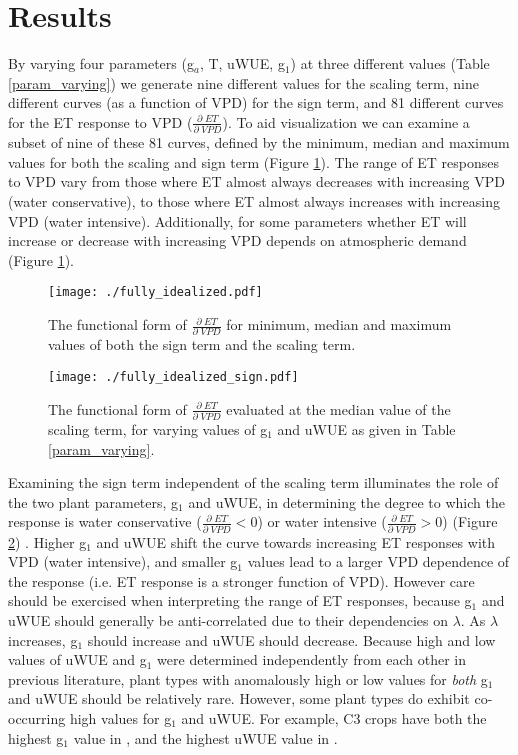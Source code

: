 \documentclass[draft]{agujournal2019}
\begin{document}
\section{Results}
\label{results}

By varying four parameters (g$_a$, T, uWUE, g$_1$) at three different
values (Table \ref{param_varying}) we generate nine different values
for the scaling term, nine different curves (as a function of VPD) for
the sign term, and 81 different curves for the ET response to VPD
($\frac{\partial \; ET}{\partial \; VPD}$). To aid visualization we
can examine a subset of nine of these 81 curves, defined by the
minimum, median and maximum values for both the scaling and sign term
(Figure \ref{full}). The range of ET responses to VPD vary from those
where ET almost always decreases with increasing VPD (water
conservative), to those where ET almost always increases with
increasing VPD (water intensive). Additionally, for some parameters
whether ET will increase or decrease with increasing VPD depends on
atmospheric demand (Figure \ref{full}).

\begin{figure}
  \centering \texttt{[image: ./fully\_idealized.pdf]}
  \caption{The functional form of $\frac{\partial \; ET}{\partial
      \; VPD}$ for minimum, median and maximum values of both the sign
    term and the scaling term.}
  \label{full}
\end{figure}

\begin{figure}
  \centering \texttt{[image: ./fully\_idealized\_sign.pdf]}
  \caption{The functional form of $\frac{\partial \; ET}{\partial
      \; VPD}$ evaluated at the median value of the scaling term, for
    varying values of g$_1$ and uWUE as given in Table \ref{param_varying}.}
  \label{sign}
\end{figure}

Examining the sign term independent of the scaling term illuminates
the role of the two plant parameters, g$_1$ and uWUE, in determining
the degree to which the response is water conservative
($\frac{\partial \; ET}{\partial \; VPD} < 0$) or water intensive
($\frac{\partial \; ET}{\partial \; VPD} > 0$) (Figure \ref{sign})
. Higher g$_1$ and uWUE shift the curve towards increasing ET
responses with VPD (water intensive), and smaller g$_1$ values lead to
a larger VPD dependence of the response (i.e. ET response is a
stronger function of VPD). However care should be exercised when
interpreting the range of ET responses, because g$_1$ and uWUE should
generally be anti-correlated due to their dependencies on
$\lambda$. As $\lambda$ increases, g$_1$ should increase and uWUE
should decrease. Because high and low values of uWUE and g$_1$ were
determined independently from each other in previous literature, plant
types with anomalously high or low values for \textit{both} g$_1$ and
uWUE should be relatively rare. However, some plant types do exhibit
co-occurring high values for g$_1$ and uWUE. For example, C3 crops
have both the highest g$_1$ value in , and the
highest uWUE value in .
\end{document}

